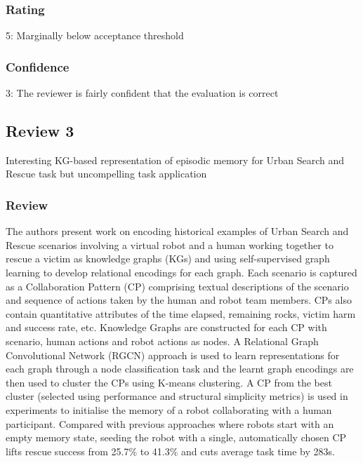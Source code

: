 \documentclass[letterpaper]{article} %
\begin{document}
\subsubsection*{Rating}
5: Marginally below acceptance threshold

\subsubsection*{Confidence}
3: The reviewer is fairly confident that the evaluation is correct

\subsection{Review 3}

Interesting KG-based representation of episodic memory for Urban Search and Rescue task but uncompelling task application

\subsubsection*{Review}
The authors present work on encoding historical examples of Urban Search and Rescue scenarios involving a virtual robot and a human working together to rescue a victim as knowledge graphs (KGs) and using self-supervised graph learning to develop relational encodings for each graph.  Each scenario is captured as a Collaboration Pattern (CP) comprising textual descriptions of the scenario and sequence of actions taken by the human and robot team members.  CPs also contain quantitative attributes of the time elapsed, remaining rocks, victim harm and success rate, etc.  Knowledge Graphs are constructed for each CP with scenario, human actions and robot actions as nodes.  A Relational Graph Convolutional Network (RGCN) approach is used to learn representations for each graph through a node classification task and the learnt graph encodings are then used to cluster the CPs using K-means clustering.  A CP from the best cluster (selected using performance and structural simplicity metrics) is used in experiments to initialise the memory of a robot collaborating with a human participant.  Compared with previous approaches where robots start with an empty memory state, seeding the robot with a single, automatically chosen CP lifts rescue success from 25.7\% to 41.3\% and cuts average task time by 283s.
\end{document}
